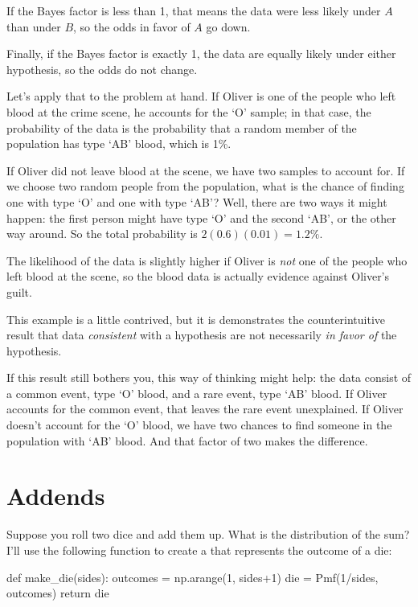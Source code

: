 \documentclass[12pt]{book}
\theoremstyle{exercise}
\begin{document}
If the Bayes factor is less than 1, that means the data were
less likely under $A$ than under $B$, so the odds in
favor of $A$ go down.

Finally, if the Bayes factor is exactly 1, the data are equally
likely under either hypothesis, so the odds do not change.

Let's apply that to the problem at hand.  If Oliver is
one of the people who left blood at the crime scene, he
accounts for the `O' sample; in that case, the probability of the data
is the probability that a random member of the population
has type `AB' blood, which is 1\%.

If Oliver did not leave blood at the scene, we have two
samples to account for.  If we choose two random people from
the population, what is the chance of finding one with type `O'
and one with type `AB'?  Well, there are two ways it might happen:
the first person might have type `O' and the second
`AB', or the other way around.  So the total probability is
$2 (0.6) (0.01) = 1.2\%$.

The likelihood of the data is slightly higher if Oliver is
{\it not} one of the people who left blood at the scene, so
the blood data is actually evidence against Oliver's guilt.


This example is a little contrived, but it is demonstrates
the counterintuitive result that data {\it consistent} with
a hypothesis are not necessarily {\it in favor of}
the hypothesis.

If this result still bothers you, this way of thinking might help: the data consist of a common event, type `O' blood, and a rare event, type `AB' blood.
If Oliver accounts for the common event, that leaves the rare
event unexplained.  If Oliver doesn't account for the
`O' blood, we have two chances to find someone in the
population with `AB' blood.  And that factor of two makes
the difference.


\section{Addends}
\label{addends}

Suppose you roll two dice and add them up.  What is the distribution of the sum?
I'll use the following function to create a  that represents the outcome of a die:

\begin{code}
def make_die(sides):
    outcomes = np.arange(1, sides+1)
    die = Pmf(1/sides, outcomes)
    return die
\end{code}
\end{document}
